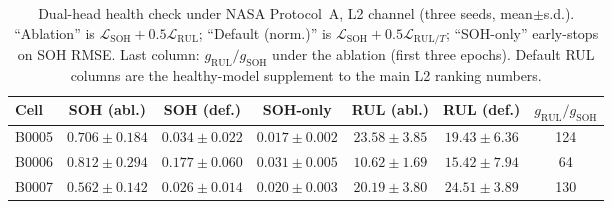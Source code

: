 \documentclass[preprint,12pt]{elsarticle}
\begin{document}
\begin{table}[htbp]
\centering
\footnotesize
\caption{Dual-head health check under NASA Protocol~A, L2 channel (three seeds, mean$\pm$s.d.).
``Ablation'' is $\mathcal{L}_{\mathrm{SOH}}+0.5\mathcal{L}_{\mathrm{RUL}}$; ``Default (norm.)'' is $\mathcal{L}_{\mathrm{SOH}}+0.5\mathcal{L}_{\mathrm{RUL}/T}$; ``SOH-only'' early-stops on SOH RMSE.
Last column: $g_{\mathrm{RUL}}/g_{\mathrm{SOH}}$ under the ablation (first three epochs).
Default RUL columns are the healthy-model supplement to the main L2 ranking numbers.}
\label{tab:sohcontrol}
\setlength{\tabcolsep}{2pt}
\begin{tabular}{@{}lcccccc@{}}
\toprule
Cell & SOH (abl.) & SOH (def.) & SOH-only & RUL (abl.) & RUL (def.) & $g_{\mathrm{RUL}}/g_{\mathrm{SOH}}$ \\
\midrule
B0005 & $0.706\pm0.184$ & $0.034\pm0.022$ & $0.017\pm0.002$ & $23.58\pm3.85$ & $19.43\pm6.36$ & 124 \\
B0006 & $0.812\pm0.294$ & $0.177\pm0.060$ & $0.031\pm0.005$ & $10.62\pm1.69$ & $15.42\pm7.94$ & 64 \\
B0007 & $0.562\pm0.142$ & $0.026\pm0.014$ & $0.020\pm0.003$ & $20.19\pm3.80$ & $24.51\pm3.89$ & 130 \\
\bottomrule
\end{tabular}
\end{table}


\end{document}

